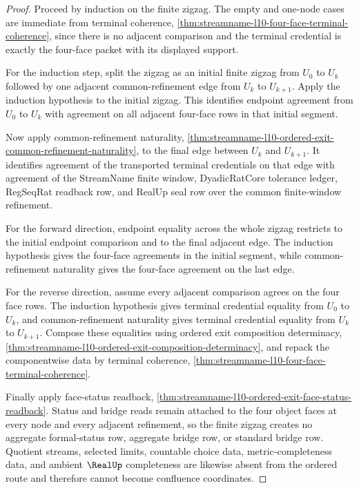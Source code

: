 \begin{proof}
Proceed by induction on the finite zigzag. The empty and one-node cases are immediate from terminal coherence, \autoref{thm:streamname-l10-four-face-terminal-coherence}, since there is no adjacent comparison and the terminal credential is exactly the four-face packet with its displayed support.

For the induction step, split the zigzag as an initial finite zigzag from $U_0$ to $U_k$ followed by one adjacent common-refinement edge from $U_k$ to $U_{k+1}$. Apply the induction hypothesis to the initial zigzag. This identifies endpoint agreement from $U_0$ to $U_k$ with agreement on all adjacent four-face rows in that initial segment.

Now apply common-refinement naturality, \autoref{thm:streamname-l10-ordered-exit-common-refinement-naturality}, to the final edge between $U_k$ and $U_{k+1}$. It identifies agreement of the transported terminal credentials on that edge with agreement of the StreamName finite window, DyadicRatCore tolerance ledger, RegSeqRat readback row, and RealUp seal row over the common finite-window refinement.

For the forward direction, endpoint equality across the whole zigzag restricts to the initial endpoint comparison and to the final adjacent edge. The induction hypothesis gives the four-face agreements in the initial segment, while common-refinement naturality gives the four-face agreement on the last edge.

For the reverse direction, assume every adjacent comparison agrees on the four face rows. The induction hypothesis gives terminal credential equality from $U_0$ to $U_k$, and common-refinement naturality gives terminal credential equality from $U_k$ to $U_{k+1}$. Compose these equalities using ordered exit composition determinacy, \autoref{thm:streamname-l10-ordered-exit-composition-determinacy}, and repack the componentwise data by terminal coherence, \autoref{thm:streamname-l10-four-face-terminal-coherence}.

Finally apply face-status readback, \autoref{thm:streamname-l10-ordered-exit-face-status-readback}. Status and bridge reads remain attached to the four object faces at every node and every adjacent refinement, so the finite zigzag creates no aggregate formal-status row, aggregate bridge row, or standard bridge row. Quotient streams, selected limits, countable choice data, metric-completeness data, and ambient $\RealUp$ completeness are likewise absent from the ordered route and therefore cannot become confluence coordinates.
\end{proof}

